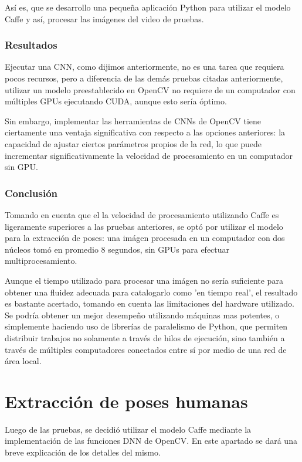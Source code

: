 \documentclass[a4paper,12pt,oneside,spanish]{book}
\begin{document}
Así es, que se desarrollo una pequeña aplicación Python para utilizar el modelo Caffe y así, procesar las imágenes del video de pruebas. 

\subsubsection{Resultados}
Ejecutar una CNN, como dijimos anteriormente, no es una tarea que requiera pocos recursos, pero a diferencia de las demás pruebas citadas anteriormente, utilizar un modelo preestablecido en OpenCV no requiere de un computador con múltiples GPUs ejecutando CUDA, aunque esto sería óptimo.\par

Sin embargo, implementar las herramientas de CNNs de OpenCV tiene ciertamente una ventaja significativa con respecto a las opciones anteriores: la capacidad de ajustar ciertos parámetros propios de la red, lo que puede incrementar significativamente la velocidad de procesamiento en un computador sin GPU.\par

\subsubsection{Conclusión}
Tomando en cuenta que el la velocidad de procesamiento utilizando Caffe es ligeramente superiores a las pruebas anteriores, se optó por utilizar el modelo para la extracción de poses: una imágen procesada en un computador con dos núcleos tomó en promedio 8 segundos, sin GPUs para efectuar multiprocesamiento.\par

Aunque el tiempo utilizado para procesar una imágen no sería suficiente para obtener una fluidez adecuada para catalogarlo como 'en tiempo real', el resultado es bastante acertado, tomando en cuenta las limitaciones del hardware utilizado. Se podría obtener un mejor desempeño utilizando máquinas mas potentes, o simplemente haciendo uso de librerías de paralelismo de Python, que permiten distribuir trabajos no solamente a través de hilos de ejecución, sino también a través de múltiples computadores conectados entre sí por medio de una red de área local.\par


\section{Extracción de poses humanas}
Luego de las pruebas, se decidió utilizar el modelo Caffe mediante la implementación de las funciones DNN de OpenCV. En este apartado se dará una breve explicación de los detalles del mismo.\par
\end{document}
